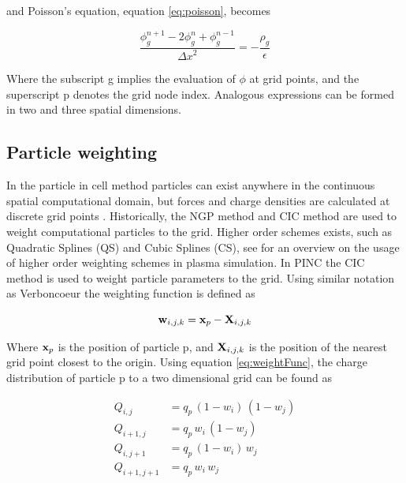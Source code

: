 and Poisson's equation, equation \eqref{eq:poisson}, becomes

\begin{equation}\label{eq:poissonDescrete}
    \frac{\phi^{n+1}_g - 2\phi^n_g + \phi^{n-1}_g}{{\Delta x}^2} = - \frac{\rho_g}{\epsilon}
\end{equation}


Where the subscript g implies the evaluation of $\phi$ at grid points, and the superscript p denotes the grid node index. Analogous expressions can be formed in two and three spatial dimensions.

\subsection{Particle weighting}
In the particle in cell method particles can exist anywhere in the continuous spatial computational domain, but forces and charge densities are calculated at discrete grid points \parencite[chapter 2.6]{Birdsall2004}. Historically, the NGP method and CIC method are used to weight computational particles to the grid. Higher order schemes exists, such as Quadratic Splines (QS) and Cubic Splines (CS), see \parencite{Okuda1979} for an overview on the usage of higher order weighting schemes in plasma simulation. In PINC the CIC method is used to weight particle parameters to the grid. Using similar notation as Verboncoeur \parencite{Verboncoeur2005} the weighting function is defined as 

\begin{equation}\label{eq:weightFunc}
    \vb{w}_{i,j,k} = \vb{x}_p - \vb{X}_{i,j,k}
\end{equation}

Where $\vb{x}_p$ is the position of particle p, and $\vb{X}_{i,j,k}$ is the position of the nearest grid point closest to the origin. Using equation \eqref{eq:weightFunc}, the charge distribution of particle p to a two dimensional grid can be found as

\begin{subequations}
    \begin{align*}
        Q_{i,j} &= q_p \, (1 - w_i) \, (1 - w_j) \\
        Q_{i+1,j} &= q_p \, w_i \, (1 - w_j) \\
        Q_{i,j+1} &= q_p \, (1 - w_i) \, w_j \\
        Q_{i+1,j+1} &= q_p \, w_i \, w_j 
    \end{align*}
\end{subequations}

